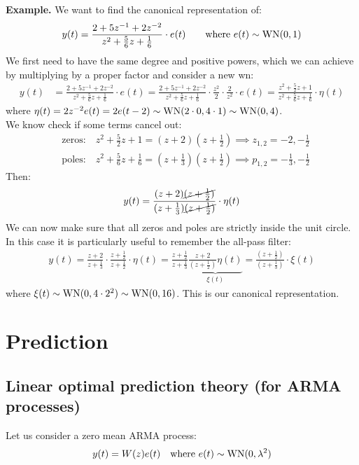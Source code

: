 \textbf{Example.}
We want to find the canonical representation of:
\begin{align*}
	y(t)=\frac{2+5z^{-1}+2z^{-2}}{z^2+\frac{5}{6}z+\frac{1}{6}}\cdot e(t)  \qquad \text{where } e(t)\sim \operatorname{WN}(0,1)
\end{align*}
We first need to have the same degree and positive powers, which we can achieve by multiplying by a proper factor and consider a new \gls{wn}:
\begin{align*}
	y(t)&=\frac{2+5z^{-1}+2z^{-2}}{z^2+\frac{5}{6}z+\frac{1}{6}}\cdot e(t)=\frac{2+5z^{-1}+2z^{-2}}{z^2+\frac{5}{6}z+\frac{1}{6}}\cdot\frac{z^2}{2}\cdot\frac{2}{z^2}\cdot e(t)=\frac{z^2+\frac{5}{2}z+1}{z^2+\frac{5}{6}z+\frac{1}{6}}\cdot \eta(t)
\end{align*}
where $\eta(t)=2z^{-2}e(t)=2e(t-2)\sim \operatorname{WN}(2\cdot0,4\cdot 1)\sim \operatorname{WN}(0,4)$.\\
We know check if some terms cancel out:
\begin{align*}
	&\text{zeros:}\quad z^2+\frac{5}{2}z+1=(z+2)\left( z+\frac{1}{2} \right)   \implies z_{1,2}=-2,-\frac{1}{2}\\
	&\text{poles:}\quad z^2+\frac{5}{6}z+\frac{1}{6}=\left( z+\frac{1}{3} \right)  \left( z+\frac{1}{2} \right) \implies p_{1,2}=-\frac{1}{3},-\frac{1}{2}
\end{align*}
Then:
\begin{align*}
	y(t)=\frac{(z+2)\cancel{(z+\frac{1}{2})}}{(z+\frac{1}{3})\cancel{(z+\frac{1}{2})}}\cdot \eta(t) 
\end{align*}
We can now make sure that all zeros and poles are strictly inside the unit circle. In this case it is particularly useful to remember the all-pass filter:
\begin{align*}
	y(t)=\frac{z+2}{z+\frac{1}{3}}\cdot\frac{z+\frac{1}{2} }{z+\frac{1}{2}}\cdot\eta(t)=\frac{z+\frac{1}{2}}{z+\frac{1}{3}}\underbrace{\frac{z+2}{(z+\frac{1}{2})}\eta(t)}_{\xi(t)}=\frac{(z+\frac{1}{2})}{(z+\frac{1}{3})}\cdot \xi(t)
\end{align*}
where $\xi(t)\sim \operatorname{WN}(0,4\cdot2^2)\sim \operatorname{WN}(0,16)$. This is our canonical representation.

\chapter{Prediction}
\section{Linear optimal prediction theory (for ARMA processes)}
Let us consider a zero mean ARMA process:
\[
	y(t)=W(z)e(t) \quad \text{where }e(t)\sim \operatorname{WN}(0,\lambda^{2} )
\]

